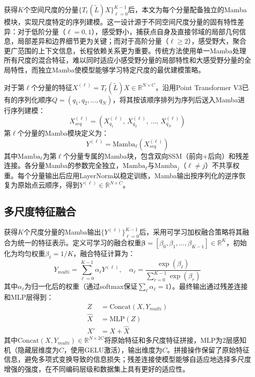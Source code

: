 \documentclass[12pt,a4paper,openany,oneside]{ctexbook}
\theoremstyle{definition}
\theoremstyle{remark}
\begin{document}
获得$K$个空间尺度的分量$\{T_\ell(\tilde{L})X\}_{\ell=0}^{K-1}$后，本文为每个分量配备独立的Mamba模块，实现尺度特定的序列建模。这一设计源于不同空间尺度分量的固有特性差异：对于低阶分量（$\ell=0,1$），感受野小，捕获点自身及直接邻域的局部几何信息，局部差异和边界细节更为关键；而对于高阶分量（$\ell \geq 2$），感受野大，聚合更广范围的上下文信息，长程依赖关系更为重要。传统方法使用单一Mamba处理所有尺度的混合特征，难以同时适应小感受野分量的局部特性和大感受野分量的全局特性，而独立Mamba使模型能够学习特定尺度的最优建模策略。

对于第$\ell$个分量的特征$X^{(\ell)} = T_\ell(\tilde{L})X \in \mathbb{R}^{N \times C}$，沿用Point Transformer V3已有的序列化顺序$Q = (q_1, q_2, \ldots, q_N)$，将其按该顺序排列为序列后送入Mamba进行序列建模：
\begin{equation}
X^{(\ell)}_{seq} = \left(X^{(\ell)}_{q_1},\, X^{(\ell)}_{q_2},\, \ldots,\, X^{(\ell)}_{q_N}\right)
\end{equation}
第$\ell$个分量的Mamba模块定义为：
\begin{equation}
Y^{(\ell)} = \text{Mamba}_\ell(X^{(\ell)}_{seq})
\end{equation}
其中$\text{Mamba}_\ell$为第$\ell$个分量专属的Mamba块，包含双向SSM（前向+后向）和残差连接。各分量Mamba的参数完全独立，$\text{Mamba}_\ell$与$\text{Mamba}_j$（$\ell \neq j$）不共享权重。每个分量输出后应用LayerNorm以稳定训练，Mamba输出按序列化的逆序恢复为原始点云顺序，得到$Y^{(\ell)} \in \mathbb{R}^{N \times C}$。

\subsection{多尺度特征融合}

获得$K$个尺度分量的Mamba输出$\{Y^{(\ell)}\}_{\ell=0}^{K-1}$后，采用可学习加权融合策略将其融合为统一的特征表示。定义可学习的融合权重$\boldsymbol{\beta} = [\beta_0, \beta_1, \ldots, \beta_{K-1}] \in \mathbb{R}^K$，初始化为均匀权重$\beta_\ell = 1/K$，融合特征计算为：
\begin{equation}
Y_{multi} = \sum_{\ell=0}^{K-1} \alpha_\ell Y^{(\ell)}, \quad \alpha_\ell = \frac{\exp(\beta_\ell)}{\sum_{r=0}^{K-1}\exp(\beta_r)}
\end{equation}
其中$\alpha_\ell$为归一化后的权重（通过softmax保证$\sum_\ell \alpha_\ell = 1$）。最终输出通过残差连接和MLP层得到：
\begin{equation}
\begin{aligned}
Z &= \text{Concat}(X, Y_{multi}) \\
\hat{X} &= \text{MLP}(Z) \\
X' &= X + \hat{X}
\end{aligned}
\end{equation}
其中$\text{Concat}(X, Y_{multi}) \in \mathbb{R}^{N \times 2C}$将原始特征和多尺度特征拼接，$\text{MLP}$为2层感知机（隐藏层维度为$C$，使用GELU激活），输出维度为$C$。拼接操作保留了原始特征信息，避免多项式变换导致的信息损失；残差连接使模型能够自适应地选择多尺度增强的强度，在不同编码层级和数据集上具有更好的适应性。
\end{document}
